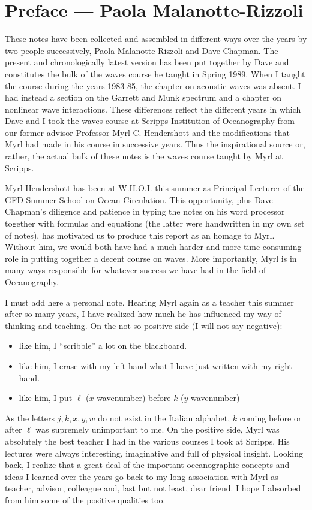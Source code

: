 
\chapter*{Preface --- Paola Malanotte-Rizzoli}
These notes have been collected and assembled in different ways over the years
by two people successively, Paola Malanotte-Rizzoli and Dave Chapman. The present
and chronologically latest version has been put together by Dave and constitutes the
bulk of the waves course he taught in Spring 1989. When I taught the course during
the years 1983-85, the chapter on acoustic waves was absent. I had instead a section on
the Garrett and Munk spectrum and a chapter on nonlinear wave interactions. These
differences reflect the different years in which Dave and I took the waves course at
Scripps Institution of Oceanography from our former advisor Professor Myrl C.
Hendershott and the modifications that Myrl had made in his course in successive
years. Thus the inspirational source or, rather, the actual bulk of these notes is the
waves course taught by Myrl at Scripps.

Myrl Hendershott has been at W.H.O.I. this summer as Principal Lecturer of
the GFD Summer School on Ocean Circulation. This opportunity, plus Dave
Chapman's diligence and patience in typing the notes on his word processor together
with formulas and equations (the latter were handwritten in my own set of notes), has
motivated us to produce this report as an homage to Myrl. Without him, we would
both have had a much harder and more time-consuming role in putting together a
decent course on waves. More importantly, Myrl is in many ways responsible for
whatever success we have had in the field of Oceanography.

I must add here a personal note. Hearing Myrl again as a teacher this summer
after so many years, I have realized how much he has influenced my way of thinking
and teaching. On the not-so-positive side (I will not say negative):
\begin{itemize}[leftmargin=2.2em,itemsep=0.2em,topsep=0.3em]
	\item like him, I ``scribble'' a lot on the blackboard.
	\item like him, I erase with my left hand what I have just written with my right hand.
	\item like him, I put $\ell$ ($x$ wavenumber) before $k$ ($y$ wavenumber)
\end{itemize}
As the letters $j,k,x,y,w$ do not exist in the Italian alphabet, $k$ coming before or after
$\ell$ was supremely unimportant to me. On the positive side, Myrl was absolutely the
best teacher I had in the various courses I took at Scripps. His lectures were always
interesting, imaginative and full of physical insight. Looking back, I realize that a
great deal of the important oceanographic concepts and ideas I learned over the years
go back to my long association with Myrl as teacher, advisor, colleague and, last but
not least, dear friend. I hope I absorbed from him some of the positive qualities too.

